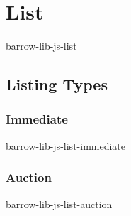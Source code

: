 \section{List}
barrow-lib-js-list

\subsection{Listing Types}

\subsubsection{Immediate}
barrow-lib-js-list-immediate

\subsubsection{Auction}
barrow-lib-js-list-auction
